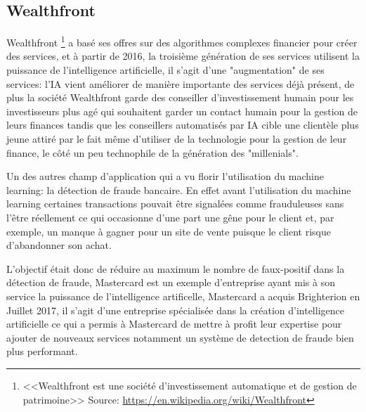         \subsection*{Wealthfront}
            Wealthfront \footnote{<<Wealthfront est une société d'investissement automatique 
            et de gestion de patrimoine>> \newline Source: \url{https://en.wikipedia.org/wiki/Wealthfront} }
            a basé ses offres sur des algorithmes complexes financier pour créer des services,
            et à partir de 2016, la troisième génération de ses services utilisent la puissance 
            de l'intelligence artificielle, il s'agit d'une "augmentation" de ses services: 
            l'IA vient améliorer de manière importante des services déjà présent, de plus 
            la société Wealthfront garde des conseiller d'investissement humain 
            pour les investisseurs plus agé qui souhaitent garder un contact humain pour
            la gestion de leurs finances tandis que les conseillers automatisés par IA 
            cible une clientèle plus jeune attiré par le fait même d'utiliser de la technologie 
            pour la gestion de leur finance, le côté un peu technophile de la génération des "millenials". \newline

            Un des autres champ d'application qui a vu florir l'utilisation du machine learning: 
            la détection de fraude bancaire. En effet avant l'utilisation du machine learning 
            certaines transactions pouvait être signalées comme frauduleuses sans l'être réellement 
            ce qui occasionne d'une part une gêne pour le client et, par exemple, un manque à gagner pour 
            un site de vente puisque le client risque d'abandonner son achat. \newline

            L'objectif était donc de réduire au maximum le nombre de faux-positif dans 
            la détection de fraude, Mastercard est un exemple d'entreprise ayant mis 
            à son service la puissance de l'intelligence artificelle, Mastercard a
            acquis Brighterion en Juillet 2017, il s'agit d'une entreprise spécialisée 
            dans la création d'intelligence artificielle ce qui a permis à Mastercard de 
            mettre à profit leur expertise pour ajouter de nouveaux services 
            notamment un système de detection de fraude bien plus performant. \newline

